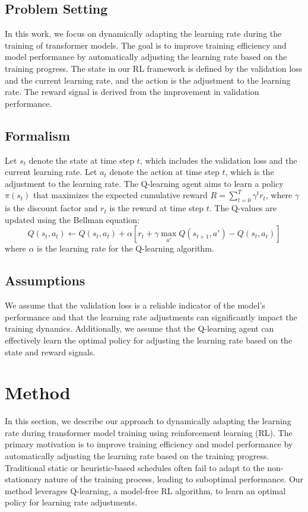 \documentclass{article} %
\begin{document}
\subsection{Problem Setting}
In this work, we focus on dynamically adapting the learning rate during the training of transformer models. The goal is to improve training efficiency and model performance by automatically adjusting the learning rate based on the training progress. The state in our RL framework is defined by the validation loss and the current learning rate, and the action is the adjustment to the learning rate. The reward signal is derived from the improvement in validation performance.

\subsection{Formalism}
Let \(s_t\) denote the state at time step \(t\), which includes the validation loss and the current learning rate. Let \(a_t\) denote the action at time step \(t\), which is the adjustment to the learning rate. The Q-learning agent aims to learn a policy \(\pi(s_t)\) that maximizes the expected cumulative reward \(R = \sum_{t=0}^{T} \gamma^t r_t\), where \(\gamma\) is the discount factor and \(r_t\) is the reward at time step \(t\). The Q-values are updated using the Bellman equation:
\[
Q(s_t, a_t) \leftarrow Q(s_t, a_t) + \alpha \left[ r_t + \gamma \max_{a'} Q(s_{t+1}, a') - Q(s_t, a_t) \right]
\]
where \(\alpha\) is the learning rate for the Q-learning algorithm.

\subsection{Assumptions}
We assume that the validation loss is a reliable indicator of the model's performance and that the learning rate adjustments can significantly impact the training dynamics. Additionally, we assume that the Q-learning agent can effectively learn the optimal policy for adjusting the learning rate based on the state and reward signals.

\section{Method}
\label{sec:method}

In this section, we describe our approach to dynamically adapting the learning rate during transformer model training using reinforcement learning (RL). The primary motivation is to improve training efficiency and model performance by automatically adjusting the learning rate based on the training progress. Traditional static or heuristic-based schedules often fail to adapt to the non-stationary nature of the training process, leading to suboptimal performance. Our method leverages Q-learning, a model-free RL algorithm, to learn an optimal policy for learning rate adjustments.
\end{document}
